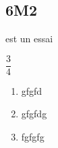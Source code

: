 \subsection*{6M2}


 est un essai

$\dfrac{3}{4}$

\begin{enumerate}
	\item gfgfd
	\item gfgfdg
	\item fgfgfg
\end{enumerate}
